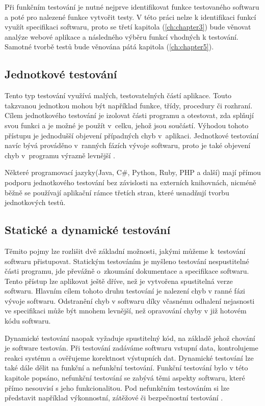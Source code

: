 \documentclass[
    color,   %
	table,   %
    twoside, %
    nolot, nolof
]{fithesis3}
\begin{document}
Při funkčním testování je nutné nejprve identifikovat funkce testovaného softwaru a poté pro nalezené funkce vytvořit testy. V této práci nelze k identifikaci funkcí využít specifikaci softwaru, proto se třetí kapitola (\ref{ch:chapter3}) bude věnovat analýze webové aplikace a následného výběru funkcí vhodných k testování. Samotné tvorbě testů bude věnována pátá kapitola (\ref{ch:chapter5}).

\subsection{Jednotkové testování}
Tento typ testování využívá malých, testovatelných částí aplikace. Touto takzvanou jednotkou mohou být například funkce, třídy, procedury či rozhraní. Cílem jednotkového testování je izolovat části programu a otestovat, zda splňují svou funkci a je možné je použít v~celku, jehož jsou součástí. Výhodou tohoto přístupu je jednodušší objevení případných chyb v~aplikaci. Jednotkové testování navíc bývá prováděno v~ranných fázích vývoje softwaru, proto je také objevení chyb v~programu výrazně levnější \cite{UnitISTQB}. 

Některé programovací jazyky(Java, C\#, Python, Ruby, PHP a další) mají přímou podporu jednotkového testování bez závislosti na externích knihovnách, nicméně běžně se používají aplikační rámce třetích stran, které usnadňují tvorbu jednotkových testů.

\subsection{Statické a dynamické testování}
Těmito pojmy lze rozlišit dvě základní možnosti, jakými můžeme k~testování softwaru přistupovat. Statickým testováním je myšleno testování nespustitelné části programu, jde převážně o~zkoumání dokumentace a specifikace softwaru. Tento přístup lze aplikovat ještě dříve, než je vytvořena spustitelná verze softwaru\cite{Patton}. Hlavním cílem tohoto druhu testování je nalezení chyb v ranné fázi vývoje softwaru. Odstranění chyb v softwaru díky včasnému odhalení nejasnosti ve specifikaci může být mnohem levnější, než opravování chyby v již hotovém kódu softwaru.

Dynamické testování naopak vyžaduje spustitelný kód, na základě jehož chování je software testován. Při testování zadáváme softwaru vstupní data, kontrolujeme reakci systému a ověřujeme korektnost výstupních dat. Dynamické testování lze také dále dělit na funkční a nefunkční testování. Funkční testování bylo v této kapitole popsáno, nefunkční testování se zabývá těmi aspekty softwaru, které přímo nesouvisí s jeho funkcionalitou. Pod nefunkčním testováním si lze představit například výkonnostní, zátěžové či bezpečnostní testování \cite{Guru99}.
\end{document}
